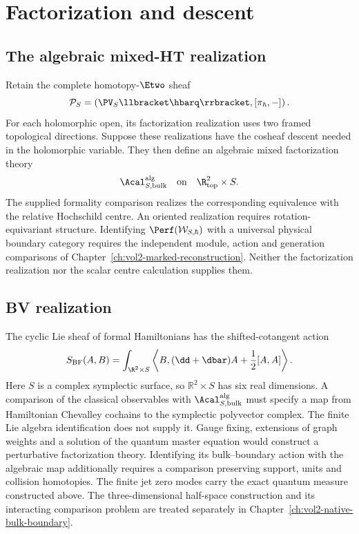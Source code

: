 \chapter{Factorization and descent}
\section{The algebraic mixed-HT realization}
Retain the complete homotopy-$\Etwo$ sheaf
\[
 \mathcal P_S=
 \left(\PV_S\llbracket\hbarq\rrbracket,[\pi_\hbar,-]\right).
\]
For each holomorphic open, its factorization realization uses two
framed topological directions. Suppose these realizations have the
cosheaf descent needed in the holomorphic variable.
They then define an algebraic mixed factorization theory
\[
 \Acal^{\mathrm{alg}}_{S,\mathrm{bulk}}
\quad\text{on}\quad
 \R^2_{\mathrm{top}}\times S.
\]
The supplied formality comparison realizes the corresponding
equivalence with the relative Hochschild centre.
An oriented realization requires rotation-equivariant structure.
Identifying $\Perf(\mathcal W_{S,\hbar})$ with a universal physical
boundary category requires the independent module, action and
generation comparisons of Chapter~\ref{ch:vol2-marked-reconstruction}.
Neither the factorization realization nor the scalar centre
calculation supplies them.

\section{BV realization}
The cyclic Lie sheaf of formal Hamiltonians has the shifted-cotangent action
\[
 S_{\mathrm{BF}}(A,B)
 =\int_{\R^2\times S}
 \left\langle B,(\dd+\dbar)A+\frac12[A,A]\right\rangle.
\]
Here $S$ is a complex symplectic surface, so $\mathbb R^2\times S$ has six real dimensions. A comparison of the classical observables with $\Acal^{\mathrm{alg}}_{S,\mathrm{bulk}}$ must specify a map from Hamiltonian Chevalley cochains to the symplectic polyvector complex. The finite Lie algebra identification does not supply it. Gauge fixing, extensions of graph weights and a solution of the quantum master equation would construct a perturbative factorization theory. Identifying its bulk--boundary action with the algebraic map additionally requires a comparison preserving support, units and collision homotopies. The finite jet zero modes carry the exact quantum measure constructed above. The three-dimensional half-space construction and its interacting comparison problem are treated separately in Chapter~\ref{ch:vol2-native-bulk-boundary}.


